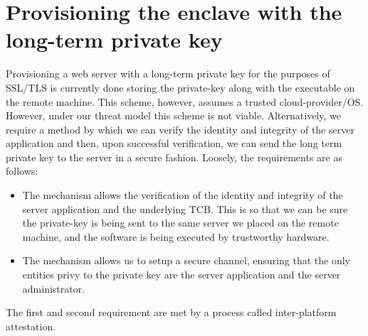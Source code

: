 \documentclass[../main.tex]{subfiles}
\begin{document}
	\section{Provisioning the enclave with the long-term private key}
		Provisioning a web server with a long-term private key for the purposes of SSL/TLS is currently done storing the private-key along with the executable on 
		the remote machine. This scheme, however, assumes a trusted cloud-provider/OS. However, under our threat model this scheme is not viable. Alternatively,
		we require a method by which we can verify the identity and integrity of the server application and then, upon successful verification, we can 
		send the long term private key to the server in a secure fashion. Loosely, the requirements are as follows:
		\begin{itemize}
			\item The mechanism allows the verification of the identity and integrity of the server application and the underlying TCB.
			This is so that we can be sure the private-key is being sent to the same server we placed on the remote machine, and the software is being executed by
			trustworthy hardware.
			\item The mechanism allows us to setup a secure channel, ensuring that the only entities privy to the private key 
			are the server application and the server administrator.
		\end{itemize} 
		The first and second requirement are met by a process called inter-platform attestation.
\end{document}
